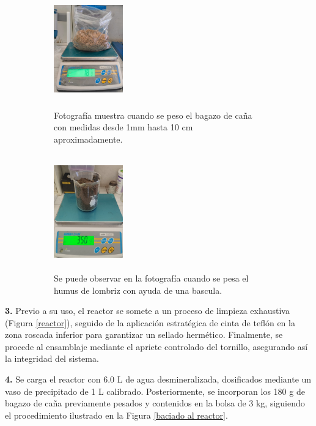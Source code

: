 \documentclass[12pt]{article}
\begin{document}
			
				\begin{figure} [H]
				\centering
				\begin{subfigure}[b]{0.45\textwidth}
					\centering
					\includegraphics[width=3cm, height=5cm]{imagenes/pesado2}
					\caption{Fotografía muestra cuando se peso el bagazo de caña con medidas desde 1mm  hasta 10 cm aproximadamente.}
					\label{bagazo_variostamaños}
				\end{subfigure}
				\hfill %
				\begin{subfigure}[b]{0.45\textwidth}
					\centering
					\includegraphics[width=3cm, height=5cm]{imagenes/humus}
					\caption{Se puede observar en la fotografía cuando se pesa el humus de lombriz con ayuda de una bascula.}
					\label{humus}
				\end{subfigure}
				\caption{}
				\label{fig:gh}
			\end{figure}
			
			
			
			\textbf{3.}	Previo a su uso, el reactor se somete a un proceso de limpieza exhaustiva (Figura \ref{reactor}), seguido de la aplicación estratégica de cinta de teflón en la zona roscada inferior para garantizar un sellado hermético. Finalmente, se procede al ensamblaje mediante el apriete controlado del tornillo, asegurando así la integridad del sistema.
			
			
			
			\textbf{4.}	Se carga el reactor con 6.0 L de agua desmineralizada, dosificados mediante un vaso de precipitado de 1 L calibrado. Posteriormente, se incorporan los 180 g de bagazo de caña previamente pesados y contenidos en la bolsa de 3 kg, siguiendo el procedimiento ilustrado en la Figura \ref{baciado al reactor}.
			
\end{document}
